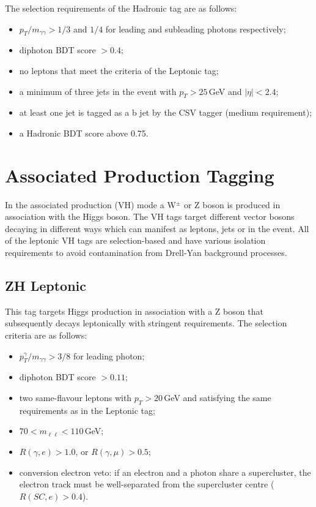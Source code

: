 The selection requirements of the \ttH Hadronic tag are as follows:
\begin{itemize}[noitemsep]
    \item $p_{T}/m_{\gamma\gamma} > 1/3$ and $1/4$ for leading and subleading photons respectively;
    \item diphoton BDT score $> 0.4$;
    \item no leptons that meet the criteria of the \ttH Leptonic tag;
    \item a minimum of three jets in the event with $p_{T} > 25$\,GeV and $|\eta| < 2.4$;
    \item at least one jet is tagged as a b jet by the CSV tagger (medium requirement);
    \item a \ttH Hadronic BDT score above 0.75.
\end{itemize}











\section[VH Tagging]{Associated Production Tagging}
In the associated production (VH) mode a W$^{\pm}$ or Z boson is produced in association with the Higgs boson. The VH tags target different vector bosons decaying in different ways which can manifest as leptons, jets or \MET in the event.
All of the leptonic VH tags are selection-based and have various isolation requirements to avoid contamination from Drell-Yan background processes.

\subsection{ZH Leptonic}
This tag targets Higgs production in association with a Z boson that subsequently decays leptonically with stringent requirements. The selection criteria are as follows:
\begin{itemize}[noitemsep]
    \item $p^{\gamma}_{T}/m_{\gamma\gamma} > 3/8$ for leading photon;
    \item diphoton BDT score $> 0.11$;
    \item two same-flavour leptons with $p_T > 20$\,GeV and satisfying the same requirements as in the \ttH Leptonic tag;
    \item $70 < m_{\ell\ell} < 110$\,GeV;
    \item $R(\gamma,e) > 1.0$, or $R(\gamma,\mu) > 0.5$;
    \item conversion electron veto: if an electron and a photon share a supercluster, the electron track must be well-separated from the supercluster centre ($R(SC,e) > 0.4$).
\end{itemize}


